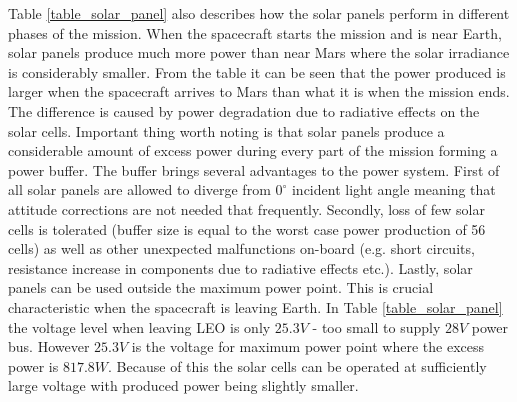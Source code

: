 \documentclass[a4paper, oneside, 11pt]{article}
\begin{document}
\noindent Table \ref{table_solar_panel} also describes how the solar panels perform in different phases of the mission. When the spacecraft starts the mission and is near Earth, solar panels produce much more power than near Mars where the solar irradiance is considerably smaller. From the table it can be seen that the power produced is larger when the spacecraft arrives to Mars than what it is when the mission ends. The difference is caused by power degradation due to radiative effects on the solar cells. Important thing worth noting is that solar panels produce a considerable amount of excess power during every part of the mission forming a power buffer. The buffer brings several advantages to the power system. First of all solar panels are allowed to diverge from $0^{\circ}$ incident light angle meaning that attitude corrections are not needed that frequently. Secondly, loss of few solar cells is tolerated (buffer size is equal to the worst case power production of 56 cells) as well as other unexpected malfunctions on-board (e.g. short circuits, resistance increase in components due to radiative effects etc.). Lastly, solar panels can be used outside the maximum power point. This is crucial characteristic when the spacecraft is leaving Earth. In Table \ref{table_solar_panel} the voltage level when leaving LEO is only $25.3V$ - too small to supply $28V$ power bus. However $25.3V$ is the voltage for maximum power point where the excess power is $817.8W$. Because of this the solar cells can be operated at sufficiently large voltage with produced power being slightly smaller.
\end{document}
